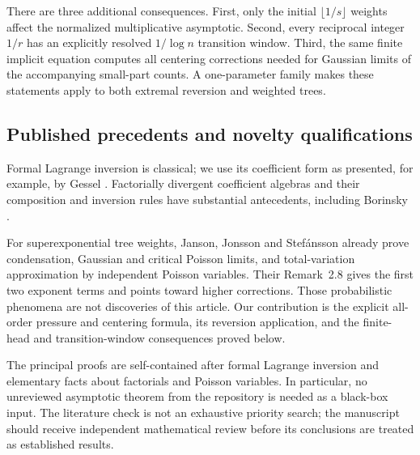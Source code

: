 \documentclass[11pt,a4paper]{article}
\theoremstyle{definition}
\theoremstyle{remark}
\numberwithin{equation}{section}
\begin{document}
There are three additional consequences. First, only the initial
$\lfloor1/s\rfloor$ weights affect the normalized multiplicative
asymptotic. Second, every reciprocal integer $1/r$ has an explicitly
resolved $1/\log n$ transition window. Third, the same finite implicit
equation computes all centering corrections needed for Gaussian limits
of the accompanying small-part counts. A one-parameter family makes
these statements apply to both extremal reversion and weighted trees.

\subsection{Published precedents and novelty qualifications}
Formal Lagrange inversion is classical; we use its coefficient form as
presented, for example, by Gessel \cite{gessel}. Factorially divergent
coefficient algebras and their composition and inversion rules have
substantial antecedents, including Borinsky \cite{borinsky}.

For superexponential tree weights, Janson, Jonsson and Stef\'ansson
\cite{jjs} already prove condensation, Gaussian and critical Poisson
limits, and total-variation approximation by independent Poisson
variables. Their Remark~2.8 gives the first two exponent terms and
points toward higher corrections. Those probabilistic phenomena are
not discoveries of this article. Our contribution is the explicit
all-order pressure and centering formula, its reversion application,
and the finite-head and transition-window consequences proved below.

The principal proofs are self-contained after formal Lagrange inversion
and elementary facts about factorials and Poisson variables. In
particular, no unreviewed asymptotic theorem from the repository is
needed as a black-box input. The literature check is not an exhaustive
priority search; the manuscript should receive independent mathematical
review before its conclusions are treated as established results.
\end{document}
